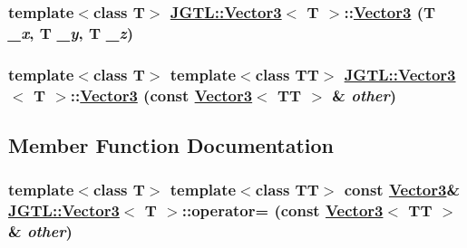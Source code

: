 \hypertarget{class_j_g_t_l_1_1_vector3_f1f2c9ca5ed3ea53ef496b0db8c86985}{
\subsubsection[Vector3]{\setlength{\rightskip}{0pt plus 5cm}template$<$class T$>$ \hyperlink{class_j_g_t_l_1_1_vector3}{JGTL::Vector3}$<$ T $>$::\hyperlink{class_j_g_t_l_1_1_vector3}{Vector3} (T {\em \_\-x}, T {\em \_\-y}, T {\em \_\-z})}}
\label{class_j_g_t_l_1_1_vector3_f1f2c9ca5ed3ea53ef496b0db8c86985}


\hypertarget{class_j_g_t_l_1_1_vector3_701fe25589e23470f1ea3ef132baffb5}{
\subsubsection[Vector3]{\setlength{\rightskip}{0pt plus 5cm}template$<$class T$>$ template$<$class TT$>$ \hyperlink{class_j_g_t_l_1_1_vector3}{JGTL::Vector3}$<$ T $>$::\hyperlink{class_j_g_t_l_1_1_vector3}{Vector3} (const \hyperlink{class_j_g_t_l_1_1_vector3}{Vector3}$<$ TT $>$ \& {\em other})}}
\label{class_j_g_t_l_1_1_vector3_701fe25589e23470f1ea3ef132baffb5}




\subsection{Member Function Documentation}
\hypertarget{class_j_g_t_l_1_1_vector3_9d8d37220803071a71104e1771729729}{
\subsubsection[operator=]{\setlength{\rightskip}{0pt plus 5cm}template$<$class T$>$ template$<$class TT$>$ const \hyperlink{class_j_g_t_l_1_1_vector3}{Vector3}\& \hyperlink{class_j_g_t_l_1_1_vector3}{JGTL::Vector3}$<$ T $>$::operator= (const \hyperlink{class_j_g_t_l_1_1_vector3}{Vector3}$<$ TT $>$ \& {\em other})}}
\label{class_j_g_t_l_1_1_vector3_9d8d37220803071a71104e1771729729}


